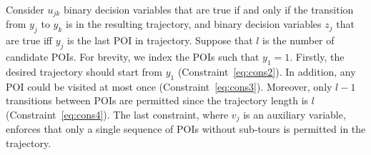 Consider $u_{jk}$ binary decision variables that are true if and only if
the transition from $y_j$ to $y_k$ is in the resulting trajectory,
and
binary decision variables
$z_j$ that are true iff $y_j$ is the last POI in trajectory.
Suppose that $l$ is the number of candidate POIs.
For brevity, we index the POIs such that $y_1 = 1$.
Firstly, the desired trajectory should start from $y_1$ (Constraint~\ref{eq:cons2}).
In addition, any POI could be visited at most once (Constraint~\ref{eq:cons3}).
Moreover, only $l-1$ transitions between POIs are permitted
since the trajectory length is $l$ (Constraint~\ref{eq:cons4}).
The last constraint, where $v_j$ is an auxiliary variable,
enforces that only a single sequence of POIs without sub-tours is permitted in the trajectory.


